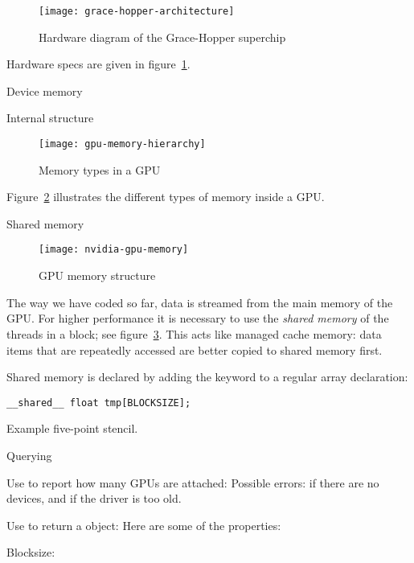 \begin{figure}[ht]
  \texttt{[image: grace-hopper-architecture]}
  \caption{Hardware diagram of the Grace-Hopper superchip}
  \label{fig:grace-hopper-hardware}
\end{figure}
Hardware specs are given in figure~\ref{fig:grace-hopper-hardware}.

 {Device memory}

 {Internal structure}

\begin{figure}[ht]
  \texttt{[image: gpu-memory-hierarchy]}
  \caption{Memory types in a GPU}
  \label{fig:gpu-hierarchy}
\end{figure}
Figure~\ref{fig:gpu-hierarchy} illustrates the different types of
memory inside a GPU.

 {Shared memory}

\begin{figure}[ht]
  \texttt{[image: nvidia-gpu-memory]}  
  \caption{GPU memory structure}
  \label{fig:gpu-memory}
\end{figure}
The way we have coded so far, data is streamed from the
main memory of the \ac{GPU}.
For higher performance it is necessary to use the
\emph{shared memory}
of the threads in a block; 
see figure~\ref{fig:gpu-memory}.
This acts like managed cache memory:
data items that are repeatedly accessed
are better copied to shared memory first.

Shared memory is declared by adding the keyword
 to a regular array declaration:
\begin{lstlisting}
__shared__ float tmp[BLOCKSIZE];
\end{lstlisting}

Example five-point stencil.

 {Querying}
\label{sec:cu-properties}

Use  to report how many \acp{GPU} are attached:
Possible errors:  if there are no devices,
and  if the driver is too old.

Use 
to return a  object:
Here are some of the properties:

Blocksize:

